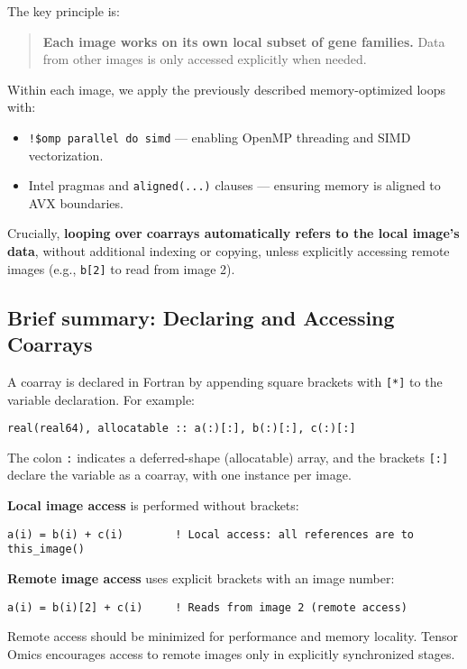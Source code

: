 \documentclass{article}
\begin{document}
The key principle is:
\begin{quote}
\textbf{Each image works on its own local subset of gene families.} Data from other images is only accessed explicitly when needed.
\end{quote}

Within each image, we apply the previously described memory-optimized loops with:
\begin{itemize}
\item \texttt{!\$omp parallel do simd} — enabling OpenMP threading and SIMD vectorization.
\item Intel pragmas and \texttt{aligned(...)} clauses — ensuring memory is aligned to AVX boundaries.
\end{itemize}

Crucially, \textbf{looping over coarrays automatically refers to the local image's data}, without additional indexing or copying, unless explicitly accessing remote images (e.g., \texttt{b[2]} to read from image 2).

\subsection{Brief summary: Declaring and Accessing Coarrays}

A coarray is declared in Fortran by appending square brackets with \texttt{[*]} to the variable declaration. For example:

\begin{verbatim}
real(real64), allocatable :: a(:)[:], b(:)[:], c(:)[:]
\end{verbatim}

The colon \texttt{:} indicates a deferred-shape (allocatable) array, and the brackets \texttt{[:]} declare the variable as a coarray, with one instance per image.

\textbf{Local image access} is performed without brackets:
\begin{verbatim}
a(i) = b(i) + c(i)        ! Local access: all references are to this_image()
\end{verbatim}

\textbf{Remote image access} uses explicit brackets with an image number:
\begin{verbatim}
a(i) = b(i)[2] + c(i)     ! Reads from image 2 (remote access)
\end{verbatim}

Remote access should be minimized for performance and memory locality. Tensor Omics encourages access to remote images only in explicitly synchronized stages.
\end{document}
